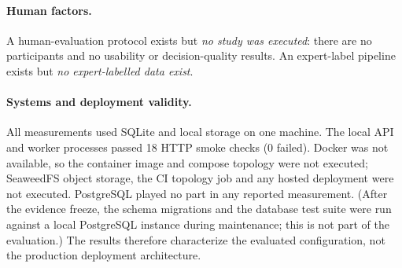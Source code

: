 \paragraph{Human factors.} A human-evaluation protocol exists but \emph{no study was
executed}: there are no participants and no usability or decision-quality results. An
expert-label pipeline exists but \emph{no expert-labelled data exist}.

\paragraph{Systems and deployment validity.} All measurements used SQLite and local
storage on one machine. The local API and worker processes passed 18 HTTP
smoke checks (0 failed). Docker was not available, so the container image
and compose topology were not executed; SeaweedFS object storage, the CI topology job
and any hosted deployment were not executed. PostgreSQL played no part in any reported
measurement. (After the evidence freeze, the schema migrations and the database test
suite were run against a local PostgreSQL instance during maintenance; this is not
part of the evaluation.) The results therefore characterize the evaluated
configuration, not the production deployment architecture.
